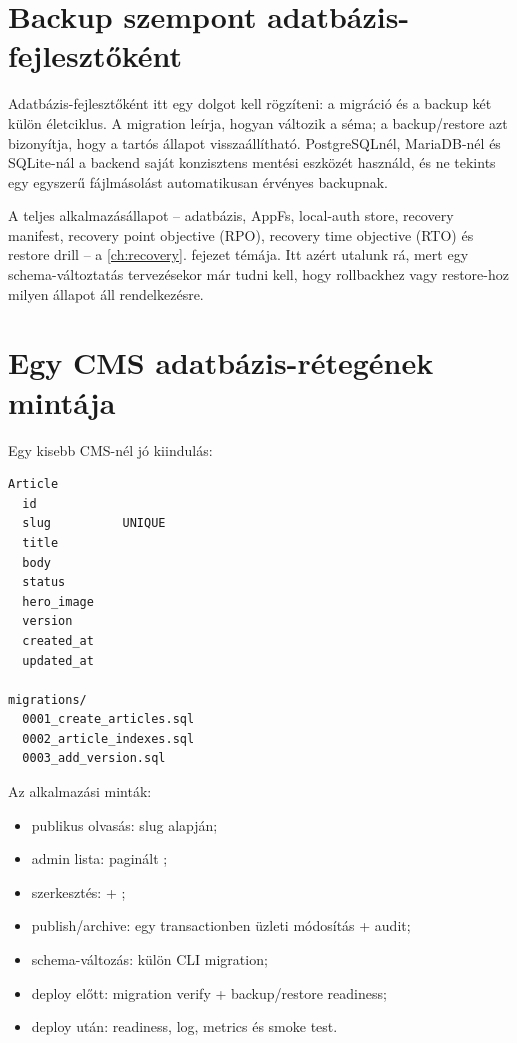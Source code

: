 \section{Backup szempont adatbázis-fejlesztőként}

Adatbázis-fejlesztőként itt egy dolgot kell rögzíteni: a migráció és a backup két külön életciklus. A migration leírja, hogyan változik a séma; a backup/restore azt bizonyítja, hogy a tartós állapot visszaállítható. PostgreSQLnél, MariaDB-nél és SQLite-nál a backend saját konzisztens mentési eszközét használd, és ne tekints egy egyszerű fájlmásolást automatikusan érvényes backupnak.

A teljes alkalmazásállapot -- adatbázis, AppFs, local-auth store, recovery manifest, recovery point objective (RPO), recovery time objective (RTO) és restore drill -- a \ref{ch:recovery}. fejezet témája. Itt azért utalunk rá, mert egy schema-változtatás tervezésekor már tudni kell, hogy rollbackhez vagy restore-hoz milyen állapot áll rendelkezésre.

\section{Egy CMS adatbázis-rétegének mintája}

Egy kisebb CMS-nél jó kiindulás:

\begin{lstlisting}
Article
  id
  slug          UNIQUE
  title
  body
  status
  hero_image
  version
  created_at
  updated_at

migrations/
  0001_create_articles.sql
  0002_article_indexes.sql
  0003_add_version.sql
\end{lstlisting}

Az alkalmazási minták:

\begin{itemize}
\item publikus olvasás:  slug alapján;
\item admin lista: paginált ;
\item szerkesztés:  + ;
\item publish/archive: egy transactionben üzleti módosítás + audit;
\item schema-változás: külön CLI migration;
\item deploy előtt: migration verify + backup/restore readiness;
\item deploy után: readiness, log, metrics és smoke test.
\end{itemize}

